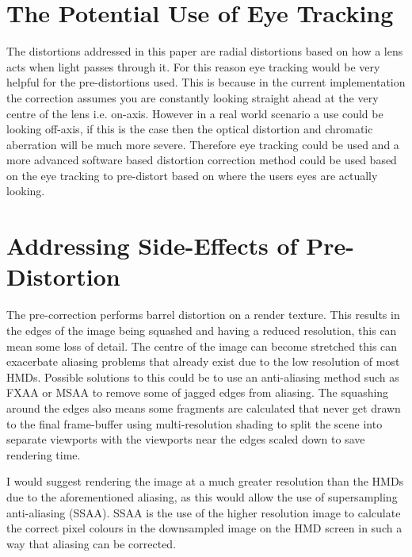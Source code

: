\documentclass[]{article}
\begin{document}
\section{The Potential Use of Eye Tracking}
The distortions addressed in this paper are radial distortions based on how a lens acts when light passes through it. For this reason eye tracking would be very helpful for the pre-distortions used. This is because in the current implementation the correction assumes you are constantly looking straight ahead at the very centre of the lens i.e. on-axis. However in a real world scenario a use could be looking off-axis, if this is the case then the optical distortion and chromatic aberration will be much more severe. Therefore eye tracking could be used and a more advanced software based distortion correction method could be used based on the eye tracking to pre-distort based on where the users eyes are actually looking.

\section{Addressing Side-Effects of Pre-Distortion}
The pre-correction performs barrel distortion on a render texture. This results in the edges of the image being squashed and having a reduced resolution, this can mean some loss of detail. The centre of the image can become stretched this can exacerbate aliasing problems that already exist due to the low resolution of most HMDs. Possible solutions to this could be to use an anti-aliasing method such as FXAA or MSAA to remove some of jagged edges from aliasing. The squashing around the edges also means some fragments are calculated that never get drawn to the final frame-buffer using multi-resolution shading to split the scene into separate viewports with the viewports near the edges scaled down to save rendering time.

I would suggest rendering the image at a much greater resolution than the HMDs due to the aforementioned aliasing, as this would allow the use of supersampling anti-aliasing (SSAA). SSAA is the use of the higher resolution image to calculate the correct pixel colours in the downsampled image on the HMD screen in such a way that aliasing can be corrected.
\end{document}
